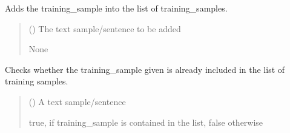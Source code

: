 \documentclass[letterpaper,10pt,english]{sphinxmanual}
\begin{document}
\begin{fulllineitems}
\begin{fulllineitems}
\label{\detokenize{medextractor.knowledge:medextractor.knowledge.semantics.SemanticRelation.add_training_sample}}
\pysigstartsignatures
{}
\pysigstopsignatures
\sphinxAtStartPar
Adds the training\_sample into the list of training\_samples.
\begin{quote}\begin{description}
\sphinxAtStartPar
{} () \textendash{} The text sample/sentence to be added

\sphinxAtStartPar
None

\end{description}\end{quote}

\end{fulllineitems}


\begin{fulllineitems}
\label{\detokenize{medextractor.knowledge:medextractor.knowledge.semantics.SemanticRelation.contains_training_sample}}
\pysigstartsignatures
{}
\pysigstopsignatures
\sphinxAtStartPar
Checks whether the training\_sample given is already included in the list of training samples.
\begin{quote}\begin{description}
\sphinxAtStartPar
{} () \textendash{} A text sample/sentence

\sphinxAtStartPar
true, if training\_sample is contained in the list, false otherwise

\end{description}\end{quote}

\end{fulllineitems}


\end{fulllineitems}
\end{document}
